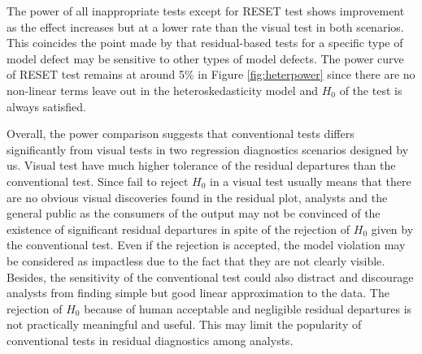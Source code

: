 \documentclass[]{interact}
\theoremstyle{plain}%
\theoremstyle{definition}
\theoremstyle{remark}
\begin{document}
The power of all inappropriate tests except for RESET test shows
improvement as the effect increases but at a lower rate than the visual
test in both scenarios. This coincides the point made by
\citet{cook1982residuals} that residual-based tests for a specific type
of model defect may be sensitive to other types of model defects. The
power curve of RESET test remains at around 5\% in Figure
\ref{fig:heterpower} since there are no non-linear terms leave out in
the heteroskedasticity model and \(H_0\) of the test is always
satisfied.

Overall, the power comparison suggests that conventional tests differs
significantly from visual tests in two regression diagnostics scenarios
designed by us. Visual test have much higher tolerance of the residual
departures than the conventional test. Since fail to reject \(H_0\) in a
visual test usually means that there are no obvious visual discoveries
found in the residual plot, analysts and the general public as the
consumers of the output may not be convinced of the existence of
significant residual departures in spite of the rejection of \(H_0\)
given by the conventional test. Even if the rejection is accepted, the
model violation may be considered as impactless due to the fact that
they are not clearly visible. Besides, the sensitivity of the
conventional test could also distract and discourage analysts from
finding simple but good linear approximation to the data. The rejection
of \(H_0\) because of human acceptable and negligible residual
departures is not practically meaningful and useful. This may limit the
popularity of conventional tests in residual diagnostics among analysts.
\end{document}
